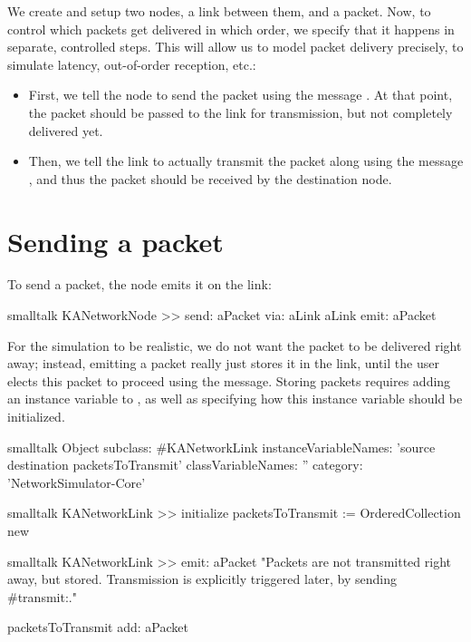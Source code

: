 \documentclass[10pt,twoside,english]{_support/latex/sbabook/sbabook}
\begin{document}
We create and setup two nodes, a link between them, and a packet.
Now, to control which packets get delivered in which order, we specify that it happens in separate, controlled steps.
This will allow us to model packet delivery precisely, to simulate latency, out-of-order reception, etc.:

\begin{itemize}
\item First, we tell the node to send the packet using the message . At that point, the packet should be passed to the link for transmission, but not completely delivered yet.
\item Then, we tell the link to actually transmit the packet along using the message , and thus the packet should be received by the destination node.
\end{itemize}
\section{Sending a packet}
To send a packet, the node emits it on the link:

\begin{displaycode}{smalltalk}
KANetworkNode >> send: aPacket via: aLink
    aLink emit: aPacket
\end{displaycode}

For the simulation to be realistic, we do not want the packet to be delivered right away; instead, emitting a packet really just stores it in the link, until the user elects this packet to proceed using the  message.
Storing packets requires adding an instance variable to , as well as specifying how this instance variable should be initialized.

\begin{displaycode}{smalltalk}
Object subclass: #KANetworkLink
    instanceVariableNames: 'source destination packetsToTransmit'
    classVariableNames: ''
    category: 'NetworkSimulator-Core'
\end{displaycode}

\begin{displaycode}{smalltalk}
KANetworkLink >> initialize
    packetsToTransmit := OrderedCollection new
\end{displaycode}

\begin{displaycode}{smalltalk}
KANetworkLink >> emit: aPacket
    "Packets are not transmitted right away, but stored.
    Transmission is explicitly triggered later, by sending #transmit:."
	
    packetsToTransmit add: aPacket
\end{displaycode}
\end{document}
